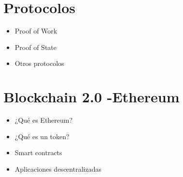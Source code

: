\documentclass{lib/temarioptc}
\begin{document}
\section{Protocolos}
\begin{itemize}
	\item Proof of Work
	\item Proof of State
	\item Otros protocolos
\end{itemize}
\section{Blockchain 2.0 -Ethereum}
\begin{itemize}
	\item ¿Qué es Ethereum?
	\item ¿Qué es un token?
	\item Smart contracts
	\item Aplicaciones descentralizadas
\end{itemize}
\end{document}
